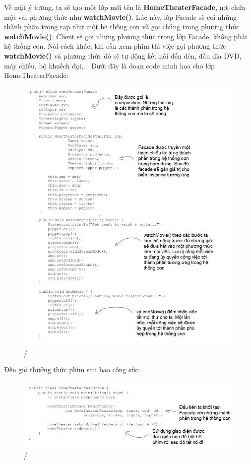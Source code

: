 Về mặt ý tưởng, ta sẽ tạo một lớp mới tên là \textbf{HomeTheaterFacade}, nơi chứa một vài phương thức như \textbf{watchMovie()}. Lúc này, lớp Facade sẽ coi những thành phần trong rạp như một hệ thống con và gọi chúng trong phương thức \textbf{watchMovie()}. Client sẽ gọi những phương thức trong lớp Facade, không phải hệ thống con. Nói cách khác, khi cần xem phim thì việc gọi phương thức \textbf{watchMovie()} và phương thức đó sẽ tự động kết nối đến đèn, đầu đĩa DVD, máy chiếu, bộ khuếch đại,...
\newpage
Dưới đây là doạn code minh họa cho lớp HomeTheaterFacade:
\begin{figure}[!htb]
    \centering
    \includegraphics[width=\textwidth]{fig/Facade/HomeTheaterFacade.png}/
\end{figure}
\newpage

Đến giờ thưởng thức phim sau bao công sức:
\begin{figure}[!htb]
    \centering
    \includegraphics[width=\textwidth]{fig/Facade/TheaterMain.png}/
\end{figure}


